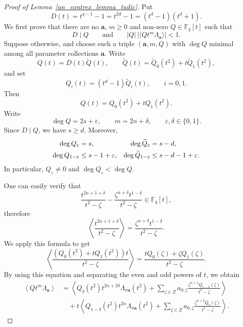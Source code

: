 \documentclass[10pt,a4paper]{amsart}
\begin{document}
\begin{proof}[Proof of Lemma~\ref{un_contrex_lemma_tadic}]
Put
\begin{equation} \label{eq:D-polynomial}
 D(t)=t^{q-1}-1=t^{2d}-1=(t^d-1)(t^d+1).
\end{equation}
We first prove that there are no $\mathbf a$, $m\geq0$ and non-zero
$Q\in\mathbb F_q[t]$ such that
\begin{equation} \label{eq:key-violation}
 D\mid Q
 \qquad\text{and}\qquad
 |Q|\,|\langle Qt^m\Lambda_{\mathbf a}\rangle|<1.
\end{equation}
Suppose otherwise, and choose such a triple $(\mathbf a, m, Q)$ with
$\deg Q$ minimal among all parameter collections $\mathbf a$. Write
\begin{equation} \label{eq:Q-parity-decomposition}
 Q(t)=D(t)\widetilde Q(t),
 \qquad
 \widetilde Q(t)=\widetilde Q_0(t^2)+t\widetilde Q_1(t^2),
\end{equation}
and set
\begin{equation} \label{eq:Qi-definition}
 Q_i(t)=(t^d-1)\widetilde Q_i(t),\qquad i=0,1.
\end{equation}
Then
\begin{equation} \label{eq:Q-even-odd}
 Q(t)=Q_0(t^2)+tQ_1(t^2).
\end{equation}
Write
\begin{equation} \label{eq:degree-parities}
 \deg Q=2s+\varepsilon,
 \qquad
 m=2n+\delta,
 \qquad \varepsilon,\delta\in\{0,1\}.
\end{equation}
Since $D\mid Q$, we have $s\geq d$.  Moreover,
\begin{align} \label{eq:parity-degrees}
 \deg Q_\varepsilon&=s,
 &\deg\widetilde Q_\varepsilon&=s-d,\notag\\
 \deg Q_{1-\varepsilon}&\leq s-1+\varepsilon,
 &\deg\widetilde Q_{1-\varepsilon}&\leq s-d-1+\varepsilon.
\end{align}
In particular, $Q_\varepsilon\ne0$ and $\deg Q_\varepsilon<\deg Q$.

One can easily verify that
$$
 \frac{t^{2n+1+\delta}}{t^2-\zeta} -
 \frac{\zeta^{n+\delta}t^{1-\delta}}{t^2-\zeta} \in \mathbb F_q[t],
$$
therefore
\[
 \left\langle
 \frac{t^{2n+1+\delta}}{t^2-\zeta}
 \right\rangle
 =
 \frac{\zeta^{n+\delta}t^{1-\delta}}{t^2-\zeta}.
\]
We apply this formula to get
$$
\left\langle \frac{(Q_0(t^2) + tQ_1(t^2))t}{t^2-\zeta}\right\rangle
= \frac{tQ_0(\zeta) + \zeta Q_1(\zeta)}{t^2-\zeta}.
$$
By using this equation and separating the even and odd powers of
$t$, we obtain
\begin{align*}
 \left\langle Qt^m\Lambda_{\mathbf a}\right\rangle
 &=
 \left\langle
 Q_\delta(t^2)t^{2n+2\delta}
 \Lambda_{\sigma\mathbf a}(t^2)
 +
 \sum_{\zeta\in Z}
 a_{0,\zeta}
 \frac{\zeta^{n+1}Q_{1-\delta}(\zeta)}
      {t^2-\zeta}
 \right\rangle
 \\
 &\quad
 +t\left\langle
 Q_{1-\delta}(t^2)t^{2n}
 \Lambda_{\sigma\mathbf a}(t^2)
 +
 \sum_{\zeta\in Z}
 a_{0,\zeta}
 \frac{\zeta^{n+\delta}Q_\delta(\zeta)}
      {t^2-\zeta}
 \right\rangle .
\end{align*}




\end{proof}
\end{document}
